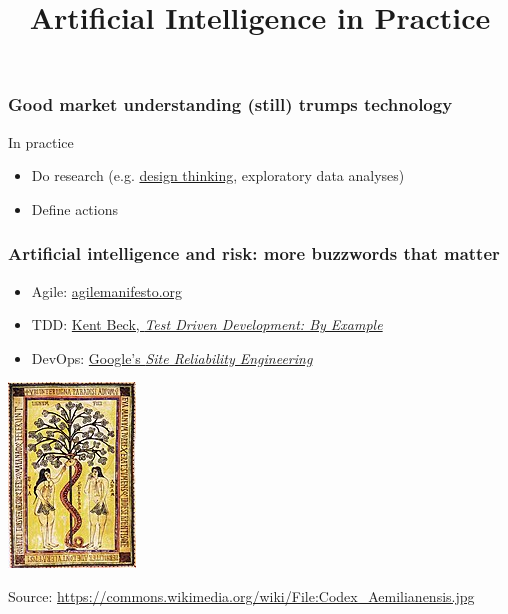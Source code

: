 

\title{Artificial Intelligence in Practice}

\maketitle


\begin{frame}
\frametitle{Good market understanding (still) trumps technology}
    \begin{center}
    \end{center}
  In practice
  \begin{itemize}
    \item Do research (e.g. \href{https://en.wikipedia.org/wiki/Design\_thinking}{design thinking}, exploratory data analyses)
    \item Define actions
  \end{itemize}
\end{frame}


\begin{frame}
\frametitle{Artificial intelligence and risk: more buzzwords that matter}
\begin{itemize}
\item Agile: \href{https://agilemanifesto.org/}{agilemanifesto.org}
\item TDD: \href{https://www.oreilly.com/library/view/test-driven-development/0321146530/}{Kent Beck, {\it Test Driven Development: By Example}}
\item DevOps: \href{https://landing.google.com/sre/books/}{Google's {\it Site Reliability Engineering}}
\end{itemize}
\begin{center}
\includegraphics[height=0.35\textheight]{graphics/Codex_Aemilianensis}
\end{center}
Source: \url{https://commons.wikimedia.org/wiki/File:Codex_Aemilianensis.jpg}
\end{frame}


